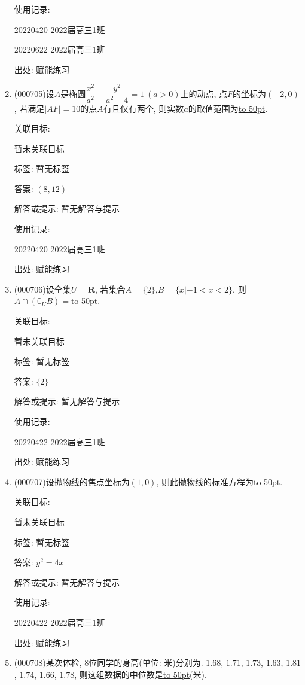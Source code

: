 \documentclass[10pt,a4paper]{article}
\newcommand{\blank}[1]{\underline{\hbox to #1pt{}}}
\begin{document}
\begin{enumerate}[1.]
使用记录:

20220420	2022届高三1班	

20220622	2022届高三1班  	


出处: 赋能练习
\item { (000705)}设$A$是椭圆$\dfrac{x^2}{a^2}+\dfrac{y^2}{a^2-4}=1 \ (a>0)$上的动点, 点$F$的坐标为$(-2,0)$, 若满足$|AF|=10$的点$A$有且仅有两个, 则实数$a$的取值范围为\blank{50}.


关联目标:

暂未关联目标



标签: 暂无标签

答案: $(8,12)$

解答或提示: 暂无解答与提示

使用记录:

20220420	2022届高三1班	


出处: 赋能练习
\item { (000706)}设全集$U=\mathbf{R}$, 若集合$A=\{2\}$,$B=\{x|-1<x<2\}$, 则$A\cap (\complement_UB)=$\blank{50}.


关联目标:

暂未关联目标



标签: 暂无标签

答案: $\{2\}$

解答或提示: 暂无解答与提示

使用记录:

20220422	2022届高三1班	


出处: 赋能练习
\item { (000707)}设抛物线的焦点坐标为$(1,0)$, 则此抛物线的标准方程为\blank{50}.


关联目标:

暂未关联目标



标签: 暂无标签

答案: $y^2=4x$

解答或提示: 暂无解答与提示

使用记录:

20220422	2022届高三1班	


出处: 赋能练习
\item { (000708)}某次体检, $8$位同学的身高(单位: 米)分别为. $1.68$, $1.71$, $1.73$, $1.63$, $1.81$, $1.74$, $1.66$, $1.78$, 则这组数据的中位数是\blank{50}(米).



\end{enumerate}
\end{document}
